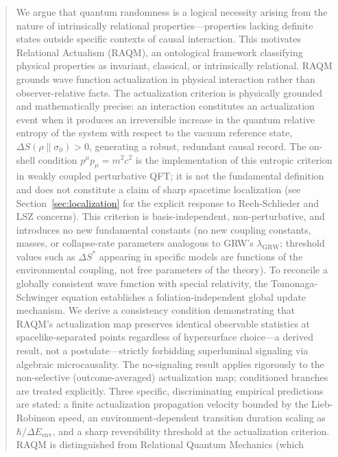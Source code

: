 \documentclass[11pt,a4paper]{article}
\theoremstyle{plain}
\theoremstyle{definition}
\theoremstyle{remark}
\begin{document}
\begin{abstract}
We argue that quantum randomness is a logical necessity arising from the nature of
intrinsically relational properties---properties lacking definite states outside
specific contexts of causal interaction. This motivates Relational Actualism
(RAQM), an ontological framework classifying physical properties as invariant,
classical, or intrinsically relational. RAQM grounds wave function actualization
in physical interaction rather than observer-relative facts. The actualization
criterion is physically grounded and mathematically precise: an interaction
constitutes an actualization event when it produces an irreversible increase in
the quantum relative entropy of the system with respect to the vacuum reference
state, $\Delta S(\rho\|\sigma_0) > 0$, generating a robust, redundant causal
record. The on-shell condition $p^{\mu}p_{\mu} = m^{2}c^{2}$ is the
implementation of this entropic criterion in weakly coupled perturbative QFT;
it is not the fundamental definition and does not constitute a claim of sharp
spacetime localization (see Section~\ref{sec:localization} for the explicit
response to Reeh-Schlieder and LSZ concerns).
This criterion is basis-independent, non-perturbative, and introduces no new
fundamental constants (no new coupling constants, masses, or collapse-rate
parameters analogous to GRW's $\lambda_{\mathrm{GRW}}$; threshold values
such as $\Delta S^*$ appearing in specific models are functions of the
environmental coupling, not free parameters of the theory). To reconcile a globally consistent wave function with
special relativity, the Tomonaga-Schwinger equation establishes a
foliation-independent global update mechanism. We derive a consistency condition
demonstrating that RAQM's actualization map preserves identical observable
statistics at spacelike-separated points regardless of hypersurface choice---a
derived result, not a postulate---strictly forbidding superluminal signaling via
algebraic microcausality. The no-signaling result applies rigorously to the
non-selective (outcome-averaged) actualization map; conditioned branches are
treated explicitly. Three specific, discriminating empirical predictions are
stated: a finite actualization propagation velocity bounded by the Lieb-Robinson
speed, an environment-dependent transition duration scaling as $\hbar/\Delta
E_{\mathrm{env}}$, and a sharp reversibility threshold at the actualization
criterion. RAQM is distinguished from Relational Quantum Mechanics (which

\end{abstract}
\end{document}
